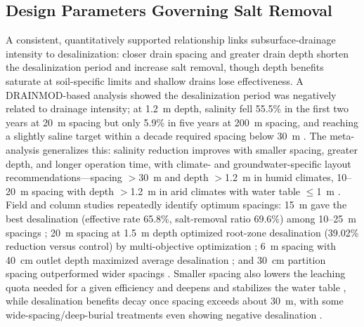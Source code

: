 \documentclass[11pt]{article}
\begin{document}
\subsection{Design Parameters Governing Salt Removal}

A consistent, quantitatively supported relationship links subsurface-drainage intensity to desalinization: closer drain spacing and greater drain depth shorten the desalinization period and increase salt removal, though depth benefits saturate at soil-specific limits and shallow drains lose effectiveness. A DRAINMOD-based analysis showed the desalinization period was negatively related to drainage intensity; at 1.2~m depth, salinity fell 55.5\% in the first two years at 20~m spacing but only 5.9\% in five years at 200~m spacing, and reaching a slightly saline target within a decade required spacing below 30~m \parencite{Chen2025}. The meta-analysis generalizes this: salinity reduction improves with smaller spacing, greater depth, and longer operation time, with climate- and groundwater-specific layout recommendations---spacing $>$30~m and depth $>$1.2~m in humid climates, 10--20~m spacing with depth $>$1.2~m in arid climates with water table $\leq$1~m \parencite{Yang2025}. Field and column studies repeatedly identify optimum spacings: 15~m gave the best desalination (effective rate 65.8\%, salt-removal ratio 69.6\%) among 10--25~m spacings \parencite{Wang2020}; 20~m spacing at 1.5~m depth optimized root-zone desalination (39.02\% reduction versus control) by multi-objective optimization \parencite{Wang2025c}; 6~m spacing with 40~cm outlet depth maximized average desalination \parencite{Han2023}; and 30~cm partition spacing outperformed wider spacings \parencite{Chen2022}. Smaller spacing also lowers the leaching quota needed for a given efficiency and deepens and stabilizes the water table \parencite{Yang2022c}, while desalination benefits decay once spacing exceeds about 30~m, with some wide-spacing/deep-burial treatments even showing negative desalination \parencite{Zhu2025b}.
\end{document}
